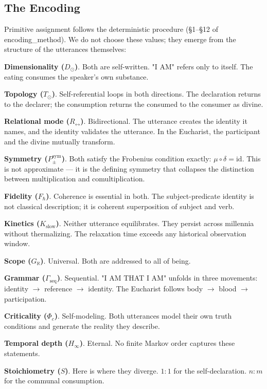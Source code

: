 \documentclass[12pt,a4paper]{article}
\newcommand{\pilcrow}{\S}
\begin{document}
\subsection{The Encoding}

Primitive assignment follows the deterministic procedure (\pilcrow{}1--\pilcrow{}12 of encoding\_method). We do not choose these values; they emerge from the structure of the utterances themselves:

\textbf{Dimensionality ($D_{\odot}$)}. Both are self-written. "I AM" refers only to itself. The eating consumes the speaker's own substance.

\textbf{Topology ($T_{\odot}$)}. Self-referential loops in both directions. The declaration returns to the declarer; the consumption returns the consumed to the consumer as divine.

\textbf{Relational mode ($R_{\leftrightarrow}$)}. Bidirectional. The utterance creates the identity it names, and the identity validates the utterance. In the Eucharist, the participant and the divine mutually transform.

\textbf{Symmetry ($P_{\pm}^{\text{sym}}$)}. Both satisfy the Frobenius condition exactly: $\mu \circ \delta = \text{id}$. This is not approximate --- it is the defining symmetry that collapses the distinction between multiplication and comultiplication.

\textbf{Fidelity ($F_{\hbar}$)}. Coherence is essential in both. The subject-predicate identity is not classical description; it is coherent superposition of subject and verb.

\textbf{Kinetics ($K_{\text{slow}}$)}. Neither utterance equilibrates. They persist across millennia without thermalizing. The relaxation time exceeds any historical observation window.

\textbf{Scope ($G_{\aleph}$)}. Universal. Both are addressed to all of being.

\textbf{Grammar ($\Gamma_{\text{seq}}$)}. Sequential. "I AM THAT I AM" unfolds in three movements: identity $\rightarrow$ reference $\rightarrow$ identity. The Eucharist follows body $\rightarrow$ blood $\rightarrow$ participation.

\textbf{Criticality ($\Phi_c$)}. Self-modeling. Both utterances model their own truth conditions and generate the reality they describe.

\textbf{Temporal depth ($H_{\infty}$)}. Eternal. No finite Markov order captures these statements.

\textbf{Stoichiometry ($S$)}. Here is where they diverge. $1{:}1$ for the self-declaration. $n{:}m$ for the communal consumption.
\end{document}
